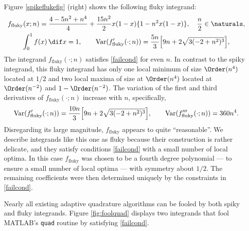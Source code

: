 \documentclass[]{article}
\DeclareMathOperator{\Var}{Var}
\theoremstyle{definition}
\theoremstyle{remark}
\begin{document}
Figure \ref{spikeflukefig} (right) shows the following fluky integrand:
\begin{subequations} \label{fluky}
\begin{gather} \label{fluky}
f_{\text{fluky}}(x;n) = \frac{4 - 5 n^2 + n^4}{4}+ \frac{15n^2}{2} x(1-x)\{1 - n^2 x(1-x)\}, \quad \frac n2 \in \naturals, \\
\int_0^1 f(x) \, \dif x = 1, \qquad \Var(f'_{\text{fluky}}(\cdot;n))= \frac{5 n}{3}  \Bigl[9 n + 2 \sqrt{3(-2 + n^2)^3} \Bigr ],
\end{gather}
\end{subequations}
The integrand $f_{\text{fluky}}(\cdot;n)$ satisfies \eqref{failcond} for even $n$.   In contrast to the spiky integrand, this fluky integrand has only one local minimum of size $\Order(n^4)$ located at $1/2$ and two local maxima of size at $\Order(n^4)$ located at $\Order(n^{-2})$ and $1-\Order(n^{-2})$.  The variation of the first and third derivatives of $f_{\text{fluky}}(\cdot;n)$ increase with $n$, specifically,
\begin{equation*}
\Var(f'_{\text{fluky}}(\cdot;n))= \frac{10 n}{3}  \Bigl[9 n + 2 \sqrt{3(-2 + n^2)^3} \Bigr ], \qquad
\Var(f'''_{\text{fluky}}(\cdot;n))= 360n^4.
\end{equation*}
Disregarding its large magnitude, $f_{\text{fluky}}$ appears to quite ``reasonable''.  We describe integrands like this one as fluky because their construction is rather delicate, and they satisfy conditions \eqref{failcond} with a small number of local optima.  In this case $f_{\text{fluky}}$ was chosen to be a fourth degree polynomial --- to ensure a small number of local optima --- with symmetry about $1/2$.  The remaining coefficients were then determined uniquely by the constraints in \eqref{failcond}.  

Nearly all existing adaptive quadrature algorithms can be fooled by both spiky and fluky integrands.  Figure \ref{fig:foolquad} displays two integrands that fool MATLAB's {\tt quad} routine by satisfying \eqref{failcond}.
\end{document}
